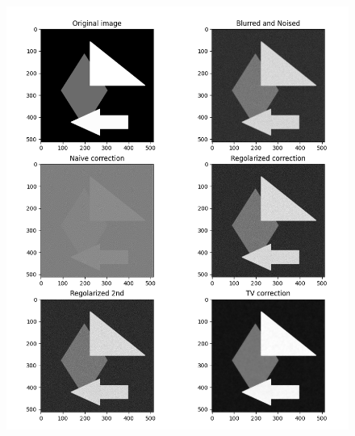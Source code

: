 \documentclass[12pt]{article}
\begin{document}
    \begin{figure}[h!]
    \centering
    \includegraphics[width=14cm]{sample6}
    \end{figure}
    \newpage
\end{document}
